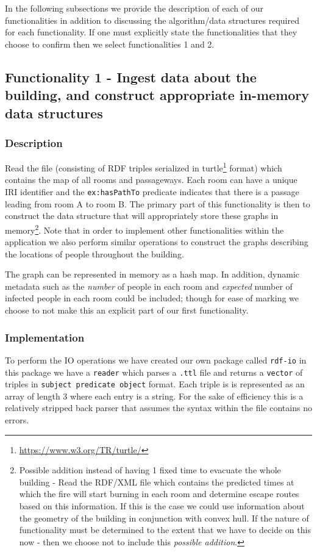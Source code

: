 \documentclass{article}
\begin{document}
In the following subsections we provide the description of each of our functionalities in addition to discussing the algorithm/data structures required for each functionality. If one must explicitly state the functionalities that they choose to confirm then we select functionalities 1 and 2.

\subsection{Functionality 1 - Ingest data about the building, and construct appropriate in-memory data structures}

\subsubsection{Description}
Read the file (consisting of RDF triples serialized in turtle\footnote{\url{https://www.w3.org/TR/turtle/}} format) which contains the map of all rooms and passageways. Each room can have a unique IRI identifier and the \texttt{ex:hasPathTo} predicate indicates that there is a passage leading from room A to room B. 
The primary part of this functionality is then to construct the data structure that will appropriately store these graphs in memory\footnote{Possible addition instead of having 1 fixed time to evacuate the whole building - Read the RDF/XML file which contains the predicted times at which the fire will start burning in each room and determine escape routes based on this information. If this is the case we could use information about the geometry of the building in conjunction with convex hull. If the nature of functionality must be determined to the extent that we have to decide on this now - then we choose not to include this \textit{possible addition}.}. Note that in order to implement other functionalities within the application we also perform similar operations to construct the graphs describing the locations of people throughout the building.


The graph can be represented in memory as a hash map. In addition, dynamic metadata such as the \textit{number} of people in each room and \textit{expected} number of infected people in each room could be included; though for ease of marking we choose to not make this an explicit part of our first functionality.

\subsubsection{Implementation}
To perform the IO operations we have created our own package called \texttt{rdf-io} in this package we have a \texttt{reader} which parses a \texttt{.ttl} file and returns a \texttt{vector} of triples in \texttt{subject predicate object} format. Each triple is is represented as an array of length 3 where each entry is a string. For the sake of efficiency this is a relatively stripped back parser that assumes the syntax within the file contains no errors.
\end{document}
